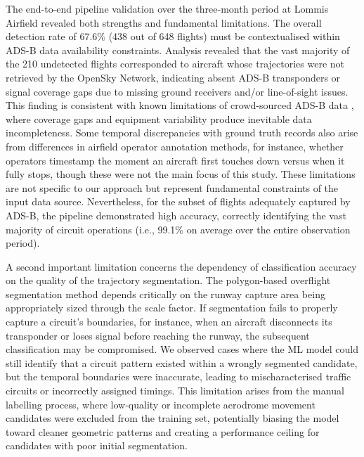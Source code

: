\documentclass[
  manuscript=proceedings,  %
  layout=preprint,         %
  year=2025,
  volume=x,
]{extra/joas}
\begin{document}
The end-to-end pipeline validation over the three-month period at Lommis Airfield revealed both strengths and fundamental limitations. The overall detection rate of 67.6\% (438 out of 648 flights) must be contextualised within ADS-B data availability constraints. Analysis revealed that the vast majority of the 210 undetected flights corresponded to aircraft whose trajectories were not retrieved by the OpenSky Network, indicating absent ADS-B transponders or signal coverage gaps due to missing ground receivers and/or line-of-sight issues. This finding is consistent with known limitations of crowd-sourced ADS-B data \cite{yang_adsb_blstm_2023, Waltert_Figuet_2023, Waltert_etal_2024, Olive_etal_2025}, where coverage gaps and equipment variability produce inevitable data incompleteness. Some temporal discrepancies with ground truth records also arise from differences in airfield operator annotation methods, for instance, whether operators timestamp the moment an aircraft first touches down versus when it fully stops, though these were not the main focus of this study. These limitations are not specific to our approach but represent fundamental constraints of the input data source. Nevertheless, for the subset of flights adequately captured by ADS-B, the pipeline demonstrated high accuracy, correctly identifying the vast majority of circuit operations (i.e., 99.1\% on average over the entire observation period).

A second important limitation concerns the dependency of classification accuracy on the quality of the trajectory segmentation. The polygon-based overflight segmentation method depends critically on the runway capture area being appropriately sized through the scale factor. If segmentation fails to properly capture a circuit's boundaries, for instance, when an aircraft disconnects its transponder or loses signal before reaching the runway, the subsequent classification may be compromised. We observed cases where the ML model could still identify that a circuit pattern existed within a wrongly segmented candidate, but the temporal boundaries were inaccurate, leading to mischaracterised traffic circuits or incorrectly assigned timings. This limitation arises from the manual labelling process, where low-quality or incomplete aerodrome movement candidates were excluded from the training set, potentially biasing the model toward cleaner geometric patterns and creating a performance ceiling for candidates with poor initial segmentation.
\end{document}
